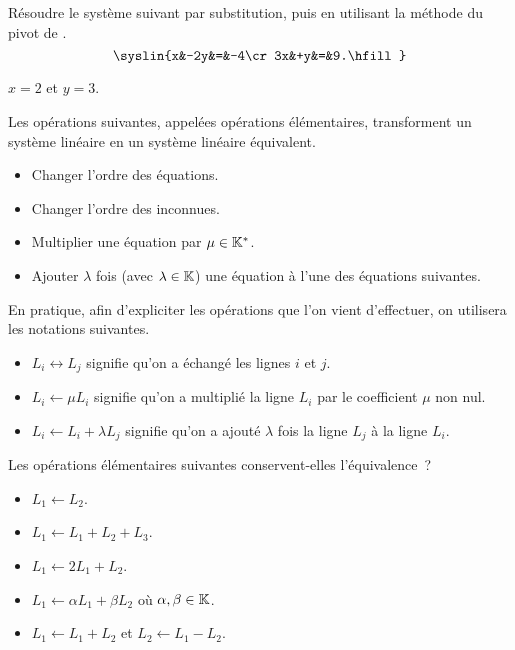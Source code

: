 \documentclass{magnoliaold}
\begin{document}
\begin{exoUnique}
\exo Résoudre le système suivant par substitution, puis en utilisant la méthode du pivot
de .
  \[\syslin{x&-2y&=&-4\cr
            3x&+y&=&9.\hfill}\]
  \begin{sol}
  $x=2$ et $y=3$.            
  \end{sol}
\end{exoUnique}

\begin{proposition}[utile=-3]
Les opérations suivantes, appelées opérations élémentaires, transforment un
système linéaire en un système linéaire équivalent.
\begin{itemize}
\item Changer l'ordre des équations.
\item Changer l'ordre des inconnues.
\item Multiplier une équation par $\mu\in\mathbb{K}^*$.
\item Ajouter $\lambda$ fois (avec $\lambda\in\mathbb{K}$) une équation à l'une des
  équations suivantes.
\end{itemize}
\end{proposition}

\begin{remarqueUnique}
\remarque En pratique, afin d'expliciter les opérations que l'on vient d'effectuer, on
  utilisera les notations suivantes.
\begin{itemize}
\item $L_i\leftrightarrow L_j$ signifie qu'on a échangé les lignes $i$ et $j$.
\item $L_i\gets \mu L_i$ signifie qu'on a multiplié la ligne $L_i$ par le coefficient $\mu$ non nul.
\item $L_i\gets L_i + \lambda L_j$ signifie qu'on a ajouté $\lambda$ fois la ligne $L_j$ à la ligne $L_i$.
\end{itemize}
\end{remarqueUnique}

\begin{exoUnique}
\exo Les opérations élémentaires suivantes conservent-elles l'équivalence~?
  \begin{itemize}
  \item $L_1 \gets L_2$.
  \item $L_1 \gets L_1+L_2+L_3$.
  \item $L_1 \gets 2 L_1 + L_2$.
  \item $L_1 \gets \alpha L_1 + \beta L_2$ où $\alpha,\beta\in\mathbb{K}$.
  \item $L_1 \gets L_1+L_2$ et $L_2 \gets L_1-L_2$.
  \end{itemize}
\end{exoUnique}
\end{document}
